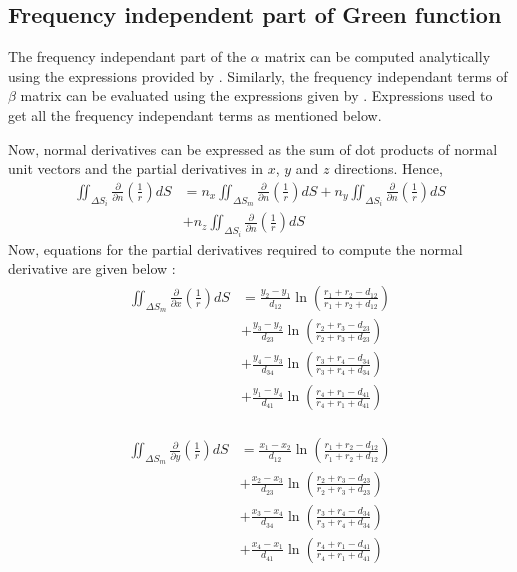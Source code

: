 \subsection{Frequency independent part of Green function}
The frequency independant part of the $\alpha$ matrix can be computed analytically using the expressions provided by \cite{hess1964calculation}. 
Similarly, the frequency independant terms of $\beta$ matrix can be evaluated using the expressions given by \cite{katz2001low}. 
Expressions used to get all the frequency independant terms as mentioned below.

Now, normal derivatives can be expressed as the sum of dot products of normal unit vectors and the partial derivatives in $x$, $y$ and $z$ directions. Hence, 
\begin{align}
    \iint_{\Delta S_i} \frac{\partial}{\partial n}\left(\frac{1}{r}\right) dS &= n_x \iint_{\Delta S_m} \frac{\partial}{\partial n}\left(\frac{1}{r}\right) dS + n_y \iint_{\Delta S_i} \frac{\partial}{\partial n}\left(\frac{1}{r}\right) dS
    \\ &+ n_z \iint_{\Delta S_i}\frac{\partial}{\partial n}\left(\frac{1}{r}\right) dS
    \label{eq:alpha_panel_comp}
\end{align}
Now, equations for the partial derivatives required to compute the normal derivative are given below :
\begin{align}
    \begin{split}
        \label{eq:partial_r_x}
        \iint_{\Delta S_m} \frac{\partial}{\partial x}\left(\frac{1}{r}\right) dS &=\frac{y_{2}-y_{1}}{d_{12}} \ln \left(\frac{r_{1}+r_{2}-d_{12}}{r_{1}+r_{2}+d_{12}}\right)\\ 
        &+ \frac{y_{3}-y_{2}}{d_{23}} \ln \left(\frac{r_{2}+r_{3}-d_{23}}{r_{2}+r_{3}+d_{23}}\right)\\ &+\frac{y_{4}-y_{3}}{d_{34}} \ln \left(\frac{r_{3}+r_{4}-d_{34}}{r_{3}+r_{4}+d_{34}}\right)\\
        &+\frac{y_{1}-y_{4}}{d_{41}} \ln \left(\frac{r_{4}+r_{1}-d_{41}}{r_{4}+r_{1}+d_{41}}\right)
    \end{split}
\end{align}

\begin{align}
    \begin{split}
        \label{eq:partial_r_y}
        \iint_{\Delta S_m} \frac{\partial}{\partial y}\left(\frac{1}{r}\right) d S
        &= \frac{x_{1}-x_{2}}{d_{12}} \ln \left(\frac{r_{1}+r_{2}-d_{12}}{r_{1}+r_{2}+d_{12}}\right)\\ &+\frac{x_{2}-x_{3}}{d_{23}} \ln \left(\frac{r_{2}+r_{3}-d_{23}}{r_{2}+r_{3}+d_{23}}\right) \\
        &+\frac{x_{3}-x_{4}}{d_{34}} \ln \left(\frac{r_{3}+r_{4}-d_{34}}{r_{3}+r_{4}+d_{34}}\right)\\ &+\frac{x_{4}-x_{1}}{d_{41}} \ln \left(\frac{r_{4}+r_{1}-d_{41}}{r_{4}+r_{1}+d_{41}}\right)
    \end{split}
\end{align}

